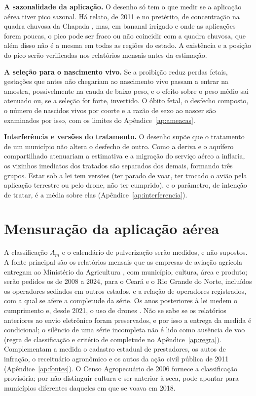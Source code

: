 \textbf{A sazonalidade da aplicação.} O desenho só tem o que medir se a
aplicação aérea tiver pico sazonal. Há relato, de 2011 e no pretérito, de
concentração na quadra chuvosa da Chapada \cite[p.~152]{carneiro2015dossie},
mas, em bananal irrigado e onde as aplicações forem poucas, o pico pode ser
fraco ou não coincidir com a quadra chuvosa, que além disso não é a mesma em
todas as regiões do estado. A existência e a posição do pico serão verificadas
nos relatórios mensais antes da estimação.

\textbf{A seleção para o nascimento vivo.} Se a proibição reduz perdas fetais,
gestações que antes não chegariam ao nascimento vivo passam a entrar na
amostra, possivelmente na cauda de baixo peso, e o efeito sobre o peso médio
sai atenuado ou, se a seleção for forte, invertido. O óbito fetal, o desfecho
composto, o número de nascidos vivos por coorte e a razão de sexo ao nascer
são examinados por isso, com os limites do Apêndice~\ref{ap:ameacas}.

\textbf{Interferência e versões do tratamento.} O desenho supõe que o
tratamento de um município não altera o desfecho de outro. Como a deriva e o
aquífero compartilhado atenuariam a estimativa e a migração do serviço aéreo a
inflaria, os vizinhos imediatos dos tratados são separados dos demais,
formando três grupos. Estar sob a lei tem versões (ter parado de voar, ter
trocado o avião pela aplicação terrestre ou pelo drone, não ter cumprido), e o
parâmetro, de intenção de tratar, é a média sobre elas
(Apêndice~\ref{ap:interferencia}).

\section{Mensuração da aplicação aérea}
\label{sec:medicao}

A classificação $A_m$ e o calendário de pulverização serão medidos, e não
supostos. A fonte principal são os relatórios mensais que as empresas de
aviação agrícola entregam ao Ministério da Agricultura \cite{mapa2008in2}, com
município, cultura, área e produto; serão pedidos os de 2008 a 2024, para o
Ceará e o Rio Grande do Norte, incluídos os operadores sediados em outros
estados, e a relação de operadores registrados, com a qual se afere a
completude da série. Os anos posteriores à lei medem o cumprimento e, desde
2021, o uso de drones \cite{mapa2021portaria298}. Não se sabe se os relatórios
anteriores ao envio eletrônico foram preservados, e por isso a entrega da
medida é condicional; o silêncio de uma série incompleta não é lido como
ausência de voo (regra de classificação e critério de completude no
Apêndice~\ref{ap:regra}). Complementam a medida o cadastro estadual de
prestadores, os autos de infração, o receituário agronômico e os autos da ação
civil pública de 2011 (Apêndice~\ref{ap:fontes}). O Censo Agropecuário de 2006
\cite{ibge2006censoagro} fornece a classificação provisória; por não
distinguir cultura e ser anterior à seca, pode apontar para municípios
diferentes daqueles em que se voava em 2018.


